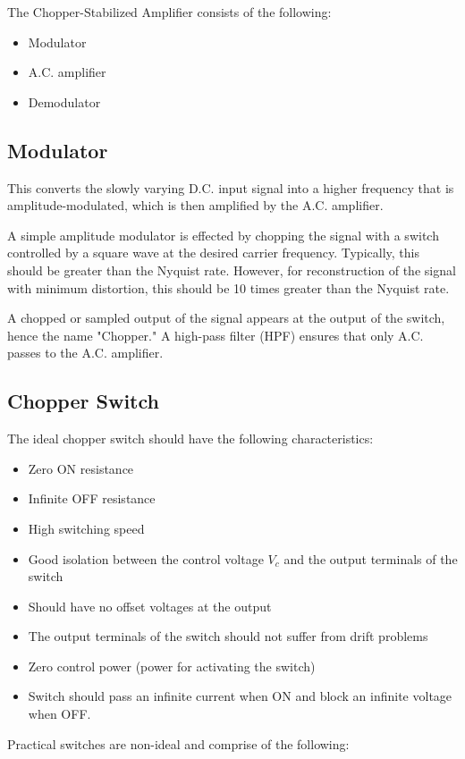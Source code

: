 \documentclass[a4paper,9pt,twoside,openany,twocolumn]{memoir}
\begin{document}
The Chopper-Stabilized Amplifier consists of the following:
\begin{itemize}
    \item Modulator
    \item A.C. amplifier
    \item Demodulator
\end{itemize}

\subsection*{Modulator}
This converts the slowly varying D.C. input signal into a higher frequency that is amplitude-modulated, which is then amplified by the A.C. amplifier.

A simple amplitude modulator is effected by chopping the signal with a switch controlled by a square wave at the desired carrier frequency. Typically, this should be greater than the Nyquist rate. However, for reconstruction of the signal with minimum distortion, this should be 10 times greater than the Nyquist rate.

A chopped or sampled output of the signal appears at the output of the switch, hence the name "Chopper." A high-pass filter (HPF) ensures that only A.C. passes to the A.C. amplifier.

\subsection*{Chopper Switch}
The ideal chopper switch should have the following characteristics:
\begin{itemize}
    \item Zero ON resistance
    \item Infinite OFF resistance
    \item High switching speed
    \item Good isolation between the control voltage $V_c$ and the output terminals of the switch
    \item Should have no offset voltages at the output
    \item The output terminals of the switch should not suffer from drift problems
    \item Zero control power (power for activating the switch)
    \item Switch should pass an infinite current when ON and block an infinite voltage when OFF.
\end{itemize}

Practical switches are non-ideal and comprise of the following:
\end{document}
